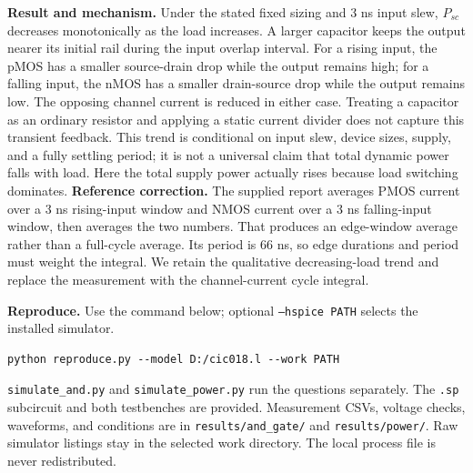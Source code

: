 \documentclass[11pt,a4paper]{article}
\begin{document}
\textbf{Result and mechanism.} Under the stated fixed sizing and 3 ns input slew, $P_{sc}$ decreases monotonically as the load increases. A larger capacitor keeps the output nearer its initial rail during the input overlap interval. For a rising input, the pMOS has a smaller source-drain drop while the output remains high; for a falling input, the nMOS has a smaller drain-source drop while the output remains low. The opposing channel current is reduced in either case. Treating a capacitor as an ordinary resistor and applying a static current divider does not capture this transient feedback.
This trend is conditional on input slew, device sizes, supply, and a fully settling period; it is not a universal claim that total dynamic power falls with load. Here the total supply power actually rises because load switching dominates.
\textbf{Reference correction.} The supplied report averages PMOS current over a 3 ns rising-input window and NMOS current over a 3 ns falling-input window, then averages the two numbers. That produces an edge-window average rather than a full-cycle average. Its period is 66 ns, so edge durations and period must weight the integral. We retain the qualitative decreasing-load trend and replace the measurement with the channel-current cycle integral.

\textbf{Reproduce.} Use the command below; optional \texttt{--hspice PATH} selects the installed simulator.
\begin{lstlisting}
python reproduce.py --model D:/cic018.l --work PATH
\end{lstlisting} \texttt{simulate\_and.py} and \texttt{simulate\_power.py} run the questions separately. The \texttt{.sp} subcircuit and both testbenches are provided. Measurement CSVs, voltage checks, waveforms, and conditions are in \texttt{results/and\_gate/} and \texttt{results/power/}. Raw simulator listings stay in the selected work directory. The local process file is never redistributed.
\end{document}
